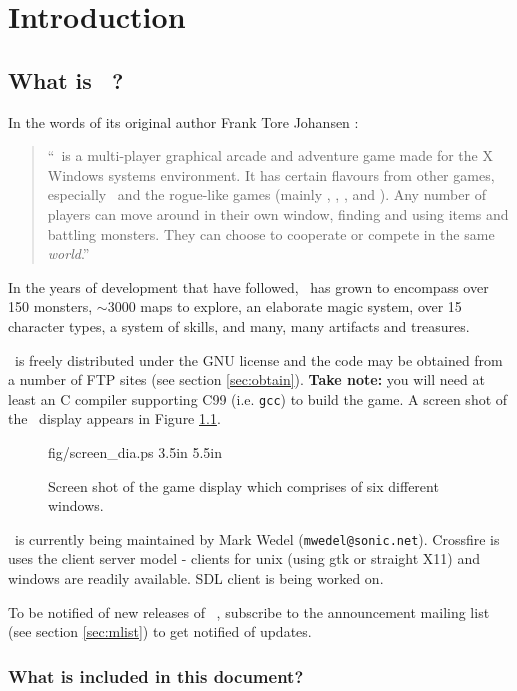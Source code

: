 
\chapter{Introduction}

\section{What is \cf\ ? }

In the words of its original author Frank Tore Johansen :
\begin{quote}
``\cf\ is a multi-player graphical arcade and adventure game made for the
X Windows systems environment. It has certain flavours from other games,
especially \gauntlet\ and the rogue-like  games (mainly \hack , \moria ,
\angband , and \ragnarok ). Any number of players can move around in their
own window, finding and using items and battling monsters. They can
choose to cooperate or compete in the same {\em world}.''
\end{quote}
In the years of development that have followed, \cf\ has grown to
encompass over 150 monsters, $\sim$3000 maps to explore, an elaborate
magic system, over 15 character types, a system of skills, and
many, many artifacts and treasures.

\cf\ is freely distributed under the GNU license and the code may be
obtained from a number of FTP sites (see section \ref{sec:obtain}).
{\bf Take note:} you will need at least an C compiler supporting C99 (i.e. {\tt gcc})
to build the game. A screen shot of the \cf\ display appears in Figure \ref{fig:dis}.

\begin{figure}
\mongovaryboth fig/screen_dia.ps 3.5in 5.5in
\caption{Screen shot of the game display which comprises of six
different windows. \label{fig:dis}}
\end{figure}

\cf\ is currently being maintained by Mark Wedel ({\tt mwedel@sonic.net}).
Crossfire is uses the client server model - clients for unix (using
gtk or straight X11) and windows are readily available.  SDL client
is being worked on.

To be notified of new releases of \cf\ ,
subscribe to the announcement mailing list
(see section \ref{sec:mlist}) to get notified of updates.

\subsection{What is included in this document?}

